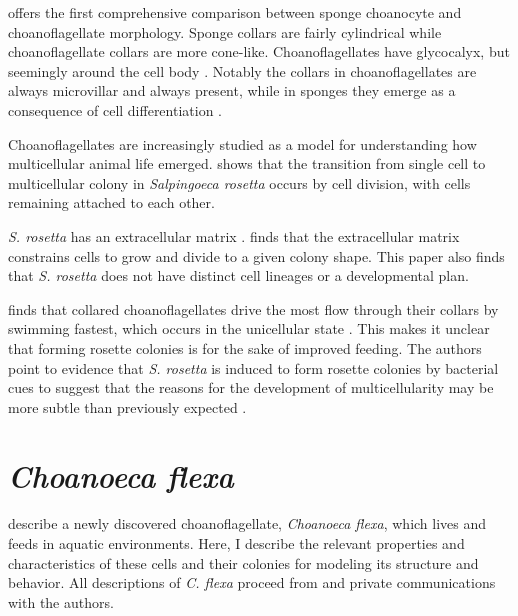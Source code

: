 \citet{mah2014} offers the first comprehensive comparison between sponge choanocyte and choanoflagellate morphology. Sponge collars are fairly cylindrical while choanoflagellate collars are more cone-like. Choanoflagellates have glycocalyx, but seemingly around the cell body \citep{leadbeater2008}. Notably the collars in choanoflagellates are always microvillar and always present, while in sponges they emerge as a consequence of cell differentiation . 

Choanoflagellates are increasingly studied as a model for understanding how multicellular animal life emerged. \citet{fairclough2010} shows that the transition from single cell to multicellular colony in \textit{Salpingoeca rosetta} occurs by cell division, with cells remaining attached to each other. 

\textit{S. rosetta} has an extracellular matrix \citep{larson2020}. \citet{larson2020} finds that the extracellular matrix constrains cells to grow and divide to a given colony shape. This paper also finds that \textit{S. rosetta} does not have distinct cell lineages or a developmental plan.

\citet{kirkegaard2016} finds that collared choanoflagellates drive the most flow through their collars by swimming fastest, which occurs in the unicellular state \citep{michelin2011}. This makes it unclear that forming rosette colonies is for the sake of improved feeding. The authors point to evidence that \textit{S. rosetta} is induced to form rosette colonies by bacterial cues to suggest that the reasons for the development of multicellularity may be more subtle than previously expected \citep{alegado2012}.

\section{\textit{Choanoeca flexa}}  %

\citet{brunet2019} describe a newly discovered choanoflagellate, \textit{Choanoeca flexa}, which lives and feeds in aquatic environments. 
Here, I describe the relevant properties and characteristics of these cells and their colonies for modeling its structure and behavior. 
All descriptions of \textit{C. flexa} proceed from \citet{brunet2019} and private communications with the authors.

